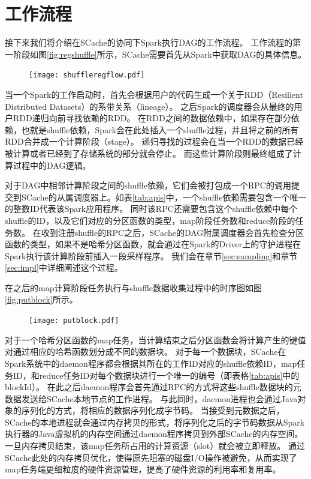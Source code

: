 \section{工作流程}

接下来我们将介绍在SCache的协同下Spark执行DAG的工作流程。
工作流程的第一阶段如图\ref{fig:regshuffle}所示，SCache需要首先从Spark中获取DAG的具体信息。

\begin{figure}[!htp]
	\centering
	\texttt{[image: shuffleregflow.pdf]}
\end{figure}

当一个Spark的工作启动时，首先会根据用户的代码生成一个关于RDD（Resilient Distributed Datasets）的系带关系（lineage）。
之后Spark的调度器会从最终的用户RDD递归向前寻找依赖的RDD。
在RDD之间的数据依赖中，如果存在部分依赖，也就是shuffle依赖，Spark会在此处插入一个shuffle过程，并且将之前的所有RDD合并成一个计算阶段（stage）。
递归寻找的过程会在当一个RDD的数据已经被计算或者已经到了存储系统的部分就会停止。
而这些计算阶段则最终组成了计算过程中的DAG逻辑。

对于DAG中相邻计算阶段之间的shuffle依赖，它们会被打包成一个RPC的调用提交到SCache的从属调度器上。如表\ref{tab:apis}中，一个shuffle依赖需要包含一个唯一的整数ID代表该Spark应用程序。
同时该RPC还需要包含这个shuffle依赖中每个shuffle的ID，以及它们对应的分区函数的类型，map阶段任务数和reduce阶段的任务数。
在收到注册shuffle的RPC之后，SCache的DAG附属调度器会首先检查分区函数的类型，如果不是哈希分区函数，就会通过在Spark的Driver上的守护进程在Spark执行该计算阶段前插入一段采样程序。
我们会在章节\ref{sec:sampling}和章节\ref{sec:impl}中详细阐述这个过程。

在之后的map计算阶段任务执行与shuffle数据收集过程中的时序图如图\ref{fig:putblock}所示。

\begin{figure}[!htp]
	\centering
	\texttt{[image: putblock.pdf]}
\end{figure}

对于一个哈希分区函数的map任务，当计算结束之后分区函数会将计算产生的键值对通过相应的哈希函数划分成不同的数据块。
对于每一个数据块，SCache在Spark系统中的daemon程序都会根据其所在的工作ID对应的shuffle依赖ID，map任务ID，和reduce任务ID对每个数据块进行一个唯一的编号（即表格\ref{tab:apis}中的blockId）。
在此之后daemon程序会首先通过RPC的方式将这些shuffle数据块的元数据发送给SCache本地节点的工作进程。
与此同时，daemon进程也会通过Java对象的序列化的方式，将相应的数据序列化成字节码。
当接受到元数据之后，SCache的本地进程就会通过内存拷贝的形式，将序列化之后的字节码数据从Spark执行器的Java虚拟机的内存空间通过daemon程序拷贝到外部SCache的内存空间。
一旦内存拷贝结束，该map任务所占用的计算资源（slot）就会被立即释放。
通过SCache此处的内存拷贝优化，使得原先阻塞的磁盘I/O操作被避免，从而实现了map任务端更细粒度的硬件资源管理，提高了硬件资源的利用率和复用率。

